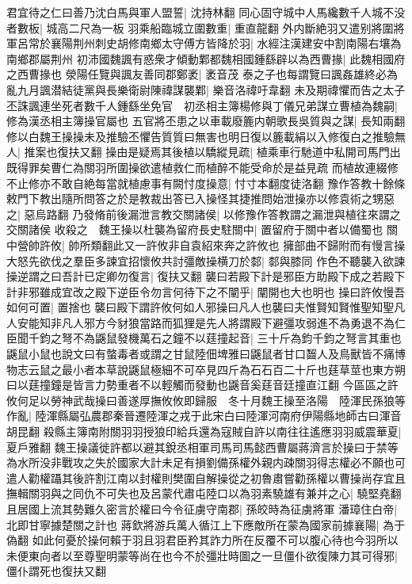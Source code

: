 君宜待之仁曰善乃沈白馬與軍人盟誓|{
	沈持林翻}
同心固守城中人馬纔數千人城不没者數板|{
	城高二尺為一板}
羽乘船臨城立圍數重|{
	重直龍翻}
外内斷絶羽又遣别將圍將軍呂常於襄陽荆州刺史胡修南鄉太守傅方皆降於羽|{
	水經注漢建安中割南陽右壤為南鄉郡屬荆州}
初沛國魏諷有惑衆才傾動鄴都魏相國鍾繇辟以為西曹掾|{
	此魏相國府之西曹掾也}
滎陽任覽與諷友善同郡鄭袤|{
	袤音茂}
泰之子也每謂覽曰諷姦雄終必為亂九月諷潜結徒黨與長樂衛尉陳禕謀襲鄴|{
	樂音洛禕吁韋翻}
未及期禕懼而告之太子丕誅諷連坐死者數千人鍾繇坐免官　初丞相主簿楊修與丁儀兄弟謀立曹植為魏嗣|{
	修為漢丞相主簿操官屬也}
五官將丕患之以車載廢簏内朝歌長吳質與之謀|{
	長知兩翻}
修以白魏王操操未及推驗丕懼告質質曰無害也明日復以簏載絹以入修復白之推驗無人|{
	推案也復扶又翻}
操由是疑焉其後植以驕縱見疏|{
	植乘車行馳道中私開司馬門出既得罪矣曹仁為關羽所圍操欲遣植救仁而植醉不能受命於是益見疏}
而植故連綴修不止修亦不敢自絶每當就植慮事有闕忖度操意|{
	忖寸本翻度徒洛翻}
豫作答教十餘條敕門下教出隨所問答之於是教裁出答已入操怪其捷推問始泄操亦以修袁術之甥惡之|{
	惡烏路翻}
乃發脩前後漏泄言教交關諸侯|{
	以修豫作答教謂之漏泄與植往來謂之交關諸侯}
收殺之　魏王操以杜襲為留府長史駐關中|{
	置留府于關中者以備蜀也}
關中營帥許攸|{
	帥所類翻此又一許攸非自袁紹來奔之許攸也}
擁部曲不歸附而有慢言操大怒先欲伐之羣臣多諫宜招懷攸共討彊敵操横刀於䣛|{
	䣛與膝同}
作色不聽襲入欲諫操逆謂之曰吾計已定卿勿復言|{
	復扶又翻}
襲曰若殿下計是邪臣方助殿下成之若殿下計非邪雖成宜改之殿下逆臣令勿言何待下之不闡乎|{
	闡開也大也明也}
操曰許攸慢吾如何可置|{
	置捨也}
襲曰殿下謂許攸何如人邪操曰凡人也襲曰夫惟賢知賢惟聖知聖凡人安能知非凡人邪方今豺狼當路而狐狸是先人將謂殿下避彊攻弱進不為勇退不為仁臣聞千鈞之弩不為鼷鼠發機萬石之鐘不以莛撞起音|{
	三十斤為鈞千鈞之弩言其重也鼷鼠小鼠也說文曰有螫毒者或謂之甘鼠陸佃埤雅曰鼷鼠者甘口齧人及鳥獸皆不痛博物志云鼠之最小者本草說鼷鼠極細不可卒見四斤為石石百二十斤也莛草莖也東方朔曰以莛撞鐘是皆言力勢重者不以輕觸而發動也鼷音奚莛音廷撞直江翻}
今區區之許攸何足以勞神武哉操曰善遂厚撫攸攸即歸服　冬十月魏王操至洛陽　陸渾民孫狼等作亂|{
	陸渾縣屬弘農郡秦晉遷陸渾之戎于此宋白曰陸渾河南府伊陽縣地師古曰渾音胡昆翻}
殺縣主簿南附關羽羽授狼印給兵還為寇賊自許以南往往遙應羽羽威震華夏|{
	夏戶雅翻}
魏王操議徙許都以避其銳丞相軍司馬司馬懿西曹屬蔣濟言於操曰于禁等為水所没非戰攻之失於國家大計未足有損劉備孫權外親内疎關羽得志權必不願也可遣人勸權躡其後許割江南以封權則樊圍自解操從之初魯肅嘗勸孫權以曹操尚存宜且撫輯關羽與之同仇不可失也及呂蒙代肅屯陸口以為羽素驍雄有兼并之心|{
	驍堅堯翻}
且居國上流其勢難久密言於權曰今令征虜守南郡|{
	孫皎時為征虜將軍}
潘璋住白帝|{
	北即甘寧據楚關之計也}
蔣欽將游兵萬人循江上下應敵所在蒙為國家前據襄陽|{
	為于偽翻}
如此何憂於操何賴于羽且羽君臣矜其詐力所在反覆不可以腹心待也今羽所以未便東向者以至尊聖明蒙等尚在也今不於彊壯時圖之一旦僵仆欲復陳力其可得邪|{
	僵仆謂死也復扶又翻}
